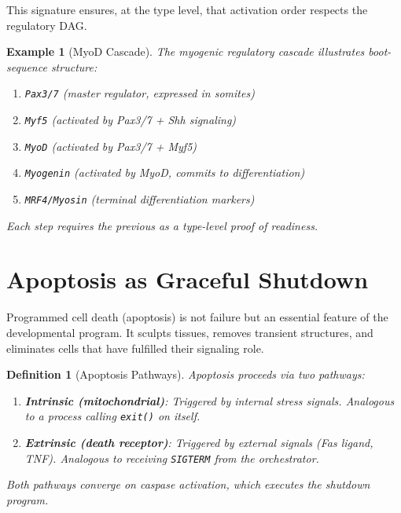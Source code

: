 \documentclass[12pt,a4paper]{article}
\newtheorem{definition}[theorem]{Definition}
\newtheorem{example}[theorem]{Example}
\begin{document}
This signature ensures, at the type level, that activation order
respects the regulatory DAG.

\begin{example}[MyoD Cascade]
The myogenic regulatory cascade illustrates boot-sequence structure:
\begin{enumerate}
  \item \texttt{Pax3/7} (master regulator, expressed in somites)
  \item \texttt{Myf5} (activated by Pax3/7 + Shh signaling)
  \item \texttt{MyoD} (activated by Pax3/7 + Myf5)
  \item \texttt{Myogenin} (activated by MyoD, commits to differentiation)
  \item \texttt{MRF4/Myosin} (terminal differentiation markers)
\end{enumerate}
Each step requires the previous as a type-level proof of readiness.
\end{example}


\section{Apoptosis as Graceful Shutdown}\label{sec:apoptosis}

Programmed cell death (apoptosis) is not failure but an essential
feature of the developmental program.  It sculpts tissues, removes
transient structures, and eliminates cells that have fulfilled their
signaling role.

\begin{definition}[Apoptosis Pathways]\label{def:apoptosis}
Apoptosis proceeds via two pathways:
\begin{enumerate}
  \item \textbf{Intrinsic (mitochondrial)}: Triggered by internal
    stress signals.  Analogous to a process calling
    \texttt{exit()} on itself.
  \item \textbf{Extrinsic (death receptor)}: Triggered by external
    signals (Fas ligand, TNF).  Analogous to receiving
    \texttt{SIGTERM} from the orchestrator.
\end{enumerate}
Both pathways converge on caspase activation, which executes
the shutdown program.
\end{definition}
\end{document}
